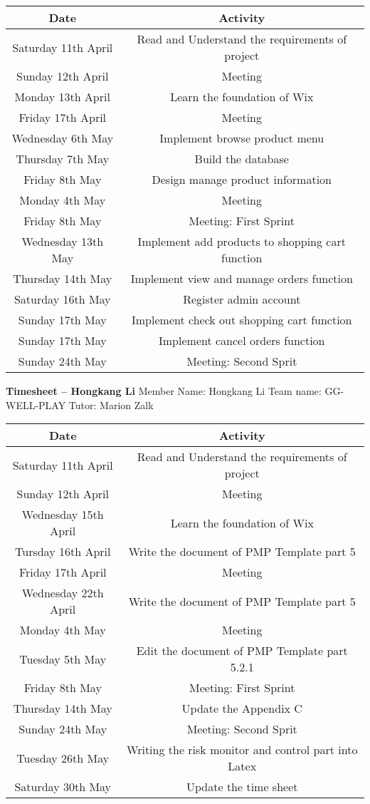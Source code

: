 \begin{tabular}{|c|c|}
\hline
Date & Activity\\
\hline
Saturday 11th April & Read and Understand the requirements of project\\
\hline
Sunday 12th April & Meeting\\
\hline
Monday 13th April & Learn the foundation of Wix\\
\hline
Friday 17th April & Meeting\\
\hline
Wednesday 6th May & Implement browse product menu\\
\hline
Thursday 7th May & Build the database \\
\hline
Friday 8th May & Design manage product information \\
\hline
Monday 4th May & Meeting\\
\hline
Friday 8th May & Meeting: First Sprint\\
\hline
Wednesday 13th May & Implement add products to shopping cart function\\
\hline
Thursday 14th May & Implement view and manage orders function\\
\hline
Saturday 16th May & Register admin account\\
\hline
Sunday 17th May & Implement check out shopping cart function\\
\hline
Sunday 17th May & Implement cancel orders function\\
\hline
Sunday 24th May & Meeting: Second Sprit\\
\hline
\end{tabular}

\textbf{Timesheet – Hongkang Li}
Member Name: Hongkang Li
Team name: GG-WELL-PLAY
Tutor: Marion Zalk

\begin{tabular}{|c|c|}
\hline
Date & Activity\\
\hline
Saturday 11th April & Read and Understand the requirements of project\\
\hline
Sunday 12th April & Meeting\\
\hline
Wednesday 15th April & Learn the foundation of Wix\\
\hline
Tursday 16th April & Write the document of PMP Template part 5\\
\hline
Friday 17th April & Meeting\\
\hline
Wednesday 22th April & Write the document of PMP Template part 5\\
\hline
Monday 4th May & Meeting\\
\hline
Tuesday 5th May & Edit the document of PMP Template part 5.2.1\\
\hline
Friday 8th May & Meeting: First Sprint\\
\hline
Thursday 14th May & Update the Appendix C\\
\hline
Sunday 24th May & Meeting: Second Sprit\\
\hline
Tuesday 26th May & Writing the risk monitor and control part into Latex\\
\hline
Saturday 30th May & Update the time sheet\\
\hline
\end{tabular}

